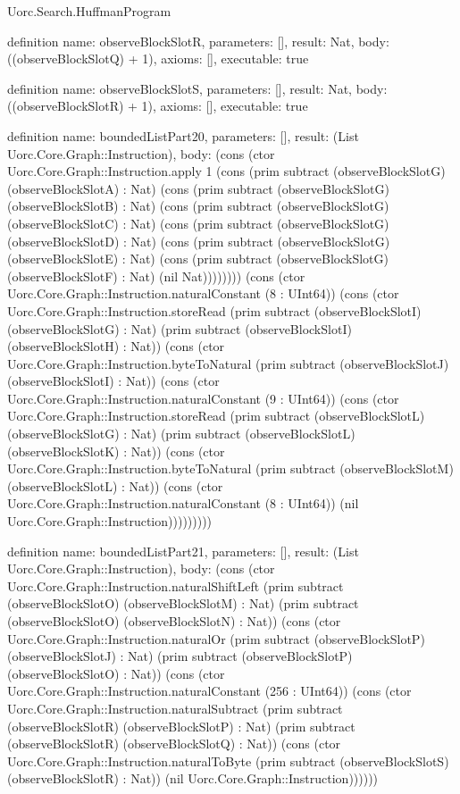 \begin{lexlean}{Uorc.Search.HuffmanProgram}
\begin{semanticmodule}
definition{
  name: observeBlockSlotR,
  parameters: [],
  result: Nat,
  body: ((observeBlockSlotQ) + 1),
  axioms: [],
  executable: true
}

definition{
  name: observeBlockSlotS,
  parameters: [],
  result: Nat,
  body: ((observeBlockSlotR) + 1),
  axioms: [],
  executable: true
}

definition{
  name: boundedListPart20,
  parameters: [],
  result: (List Uorc.Core.Graph::Instruction),
  body: (cons (ctor Uorc.Core.Graph::Instruction.apply 1 (cons (prim subtract (observeBlockSlotG) (observeBlockSlotA) : Nat) (cons (prim subtract (observeBlockSlotG) (observeBlockSlotB) : Nat) (cons (prim subtract (observeBlockSlotG) (observeBlockSlotC) : Nat) (cons (prim subtract (observeBlockSlotG) (observeBlockSlotD) : Nat) (cons (prim subtract (observeBlockSlotG) (observeBlockSlotE) : Nat) (cons (prim subtract (observeBlockSlotG) (observeBlockSlotF) : Nat) (nil Nat)))))))) (cons (ctor Uorc.Core.Graph::Instruction.naturalConstant (8 : UInt64)) (cons (ctor Uorc.Core.Graph::Instruction.storeRead (prim subtract (observeBlockSlotI) (observeBlockSlotG) : Nat) (prim subtract (observeBlockSlotI) (observeBlockSlotH) : Nat)) (cons (ctor Uorc.Core.Graph::Instruction.byteToNatural (prim subtract (observeBlockSlotJ) (observeBlockSlotI) : Nat)) (cons (ctor Uorc.Core.Graph::Instruction.naturalConstant (9 : UInt64)) (cons (ctor Uorc.Core.Graph::Instruction.storeRead (prim subtract (observeBlockSlotL) (observeBlockSlotG) : Nat) (prim subtract (observeBlockSlotL) (observeBlockSlotK) : Nat)) (cons (ctor Uorc.Core.Graph::Instruction.byteToNatural (prim subtract (observeBlockSlotM) (observeBlockSlotL) : Nat)) (cons (ctor Uorc.Core.Graph::Instruction.naturalConstant (8 : UInt64)) (nil Uorc.Core.Graph::Instruction)))))))))
}

definition{
  name: boundedListPart21,
  parameters: [],
  result: (List Uorc.Core.Graph::Instruction),
  body: (cons (ctor Uorc.Core.Graph::Instruction.naturalShiftLeft (prim subtract (observeBlockSlotO) (observeBlockSlotM) : Nat) (prim subtract (observeBlockSlotO) (observeBlockSlotN) : Nat)) (cons (ctor Uorc.Core.Graph::Instruction.naturalOr (prim subtract (observeBlockSlotP) (observeBlockSlotJ) : Nat) (prim subtract (observeBlockSlotP) (observeBlockSlotO) : Nat)) (cons (ctor Uorc.Core.Graph::Instruction.naturalConstant (256 : UInt64)) (cons (ctor Uorc.Core.Graph::Instruction.naturalSubtract (prim subtract (observeBlockSlotR) (observeBlockSlotP) : Nat) (prim subtract (observeBlockSlotR) (observeBlockSlotQ) : Nat)) (cons (ctor Uorc.Core.Graph::Instruction.naturalToByte (prim subtract (observeBlockSlotS) (observeBlockSlotR) : Nat)) (nil Uorc.Core.Graph::Instruction))))))
}


\end{semanticmodule}
\end{lexlean}
